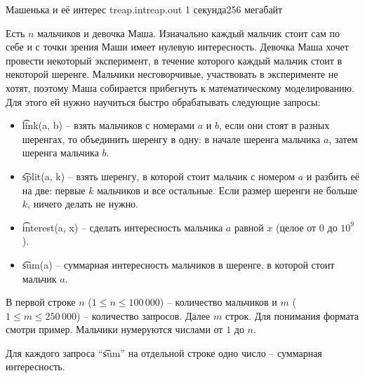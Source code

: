 
\begin{problem}{Машенька и её интерес}
{treap.in}{treap.out}
{1 секунда}{256 мегабайт}{}

Есть $n$ мальчиков и девочка Маша.
Изначально каждый мальчик стоит сам по себе и с точки зрения Маши имеет нулевую интересность.
Девочка Маша хочет провести некоторый эксперимент, в течение которого каждый мальчик стоит в некоторой шеренге.
Мальчики несговорчивые, участвовать в эксперименте не хотят, поэтому Маша собирается прибегнуть к математическому моделированию.
Для этого ей нужно научиться быстро обрабатывать следующие запросы:

\begin{itemize}
  \setlength{\parskip}{0pt}
  \setlength{\itemsep}{4pt}
  \item \t{link(a, b)} -- взять мальчиков с номерами $a$ и $b$, если они стоят в разных шеренгах, то объединить шеренгу в одну:  в начале шеренга мальчика $a$, затем шеренга мальчика $b$.
  \item \t{split(a, k)} -- взять шеренгу, в которой стоит мальчик с номером $a$ и разбить её на две: первые $k$ мальчиков и все остальные.
    Если размер шеренги не больше $k$, ничего делать не нужно.
  \item \t{interest(a, x)} -- сделать интересность мальчика $a$ равной $x$ (целое от $0$ до $10^9$).
  \item \t{sum(a)} -- суммарная интересность мальчиков в шеренге, в которой стоит мальчик $a$.
\end{itemize}

\InputFile

В первой строке $n$ ($1 \le n \le 100\,000$) -- количество мальчиков и $m$ ($1 \le m \le 250\,000$) -- количество запросов.
Далее $m$ строк. Для понимания формата смотри пример. Мальчики нумеруются числами от $1$ до $n$.

\OutputFile

Для каждого запроса ``\t{sum}'' на отдельной строке одно число -- суммарная интересность.

\Examples

\begin{example}
%
\end{example}

\end{problem}
